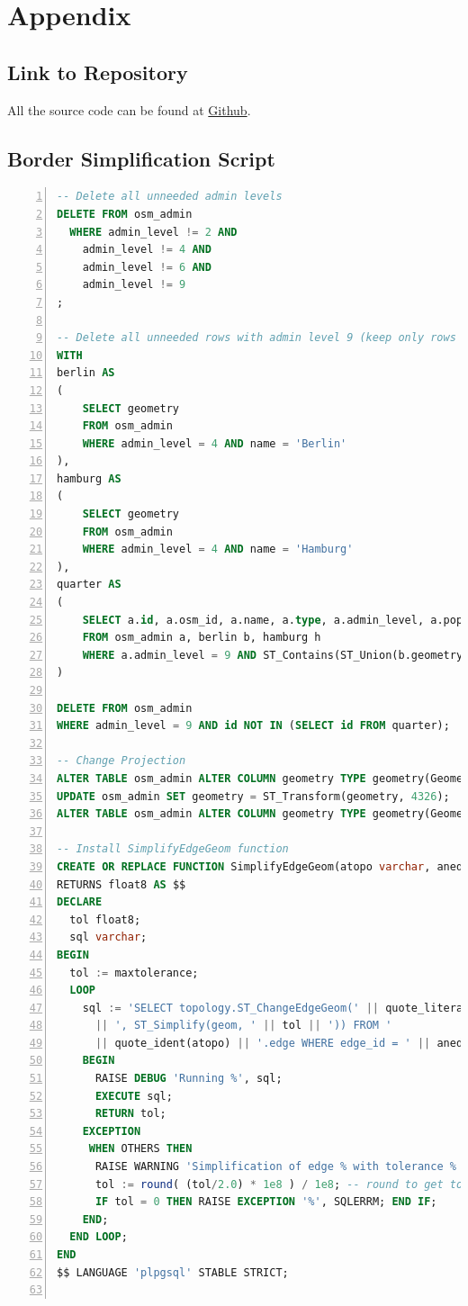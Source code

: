 \documentclass[paper=a4, fontsize=11pt]{article} %
\numberwithin{equation}{section} %
\numberwithin{figure}{section} %
\numberwithin{table}{section} %
\begin{document}
\clearpage
\printbibliography[heading=bibintoc, title=Bibliography]

\clearpage
\section{Appendix}

\subsection{Link to Repository}

All the source code can be found at \href{https://github.com/jvf/spatial-weather}{Github}.

\subsection{Border Simplification Script}{\label{simplifycation_script}

\begin{lstlisting}[language=sql,numbers=left]
-- Delete all unneeded admin levels
DELETE FROM osm_admin
  WHERE admin_level != 2 AND
    admin_level != 4 AND
    admin_level != 6 AND
    admin_level != 9
;

-- Delete all unneeded rows with admin level 9 (keep only rows of admin level 9 contained in the states hamburg and berlin)
WITH
berlin AS
(
    SELECT geometry
    FROM osm_admin
    WHERE admin_level = 4 AND name = 'Berlin'
),
hamburg AS
(
    SELECT geometry
    FROM osm_admin
    WHERE admin_level = 4 AND name = 'Hamburg'
),
quarter AS
(
    SELECT a.id, a.osm_id, a.name, a.type, a.admin_level, a.population, a.geometry
    FROM osm_admin a, berlin b, hamburg h
    WHERE a.admin_level = 9 AND ST_Contains(ST_Union(b.geometry, h.geometry), a.geometry)
)

DELETE FROM osm_admin
WHERE admin_level = 9 AND id NOT IN (SELECT id FROM quarter);

-- Change Projection
ALTER TABLE osm_admin ALTER COLUMN geometry TYPE geometry(Geometry);
UPDATE osm_admin SET geometry = ST_Transform(geometry, 4326);
ALTER TABLE osm_admin ALTER COLUMN geometry TYPE geometry(Geometry, 4326);

-- Install SimplifyEdgeGeom function
CREATE OR REPLACE FUNCTION SimplifyEdgeGeom(atopo varchar, anedge int, maxtolerance float8)
RETURNS float8 AS $$
DECLARE
  tol float8;
  sql varchar;
BEGIN
  tol := maxtolerance;
  LOOP
    sql := 'SELECT topology.ST_ChangeEdgeGeom(' || quote_literal(atopo) || ', ' || anedge
      || ', ST_Simplify(geom, ' || tol || ')) FROM '
      || quote_ident(atopo) || '.edge WHERE edge_id = ' || anedge;
    BEGIN
      RAISE DEBUG 'Running %', sql;
      EXECUTE sql;
      RETURN tol;
    EXCEPTION
     WHEN OTHERS THEN
      RAISE WARNING 'Simplification of edge % with tolerance % failed: %', anedge, tol, SQLERRM;
      tol := round( (tol/2.0) * 1e8 ) / 1e8; -- round to get to zero quicker
      IF tol = 0 THEN RAISE EXCEPTION '%', SQLERRM; END IF;
    END;
  END LOOP;
END
$$ LANGUAGE 'plpgsql' STABLE STRICT;


\end{lstlisting}}
\end{document}
